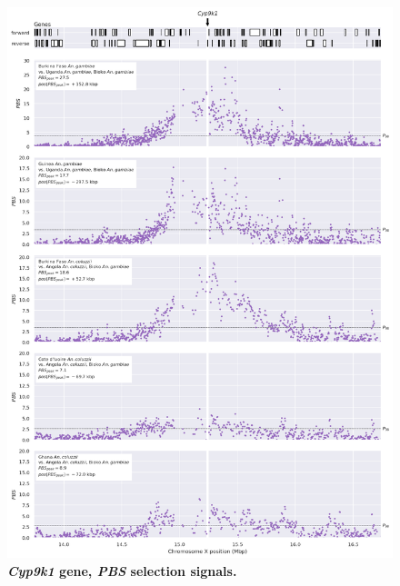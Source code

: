 \documentclass[a4paper,11pt,abstracton,hidelinks]{scrartcl}
\begin{document}
\begin{figure}[t!]
	\begin{center}
		\includegraphics*[width=1\linewidth,center]{artwork/locus_cyp9k1_pbs_pdist.png}
	\end{center}
	\caption[\textit{Cyp9k1} gene, \textit{PBS} selection signals]{
	\textbf{\textit{Cyp9k1} gene, \textit{PBS} selection signals.}
	} 
	\label{fig:locus_cyp9k1_pbs}
\end{figure}


\clearpage
\end{document}
